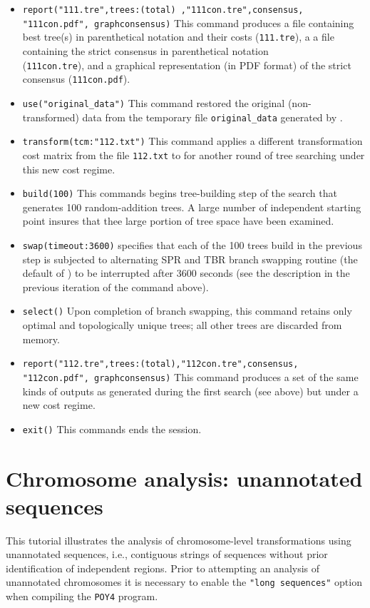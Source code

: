\begin{itemize}
\item \texttt{report("111.tre",trees:(total) ,"111con.tre",consensus,\\"111con.pdf", graphconsensus)} This command produces a file containing best tree(s) in parenthetical notation and their costs (\texttt{111.tre}), a a file containing the strict consensus in parenthetical notation \\(\texttt{111con.tre}), and a graphical representation (in PDF format) of the strict consensus (\texttt{111con.pdf}).
\item \texttt{use("original\_data")} This command restored the original (non-trans\-formed) data from the temporary file \texttt{original\_data} generated by .
\item \texttt{transform(tcm:"112.txt")} This command applies a different transformation cost matrix from the file \texttt{112.txt} to for another round of tree searching under this new cost regime.
\item \texttt{build(100)} This commands begins tree-building step of the search that generates 100 random-addition trees. A large number of independent starting point insures that thee large portion of tree space have been examined.
\item \texttt{swap(timeout:3600)}  specifies that each of the 100 trees build in the previous step is subjected to alternating SPR and TBR branch swapping routine (the default of \poy) to be interrupted after 3600 seconds (see the description in the previous iteration of the command above).
\item \texttt{select()} Upon completion of branch swapping, this command retains only optimal and topologically unique trees; all other trees are discarded from memory.
\item \texttt{report("112.tre",trees:(total),"112con.tre",consensus,\\"112con.pdf", graphconsensus)} This command produces a set of the same kinds of outputs as generated during the first search (see above) but under a new cost regime.
\item \texttt{exit()} This commands ends the \poy session.
\end{itemize}

\section{Chromosome analysis: unannotated sequences}{\label{tutorial4.6}}

This tutorial illustrates the analysis of chromosome-level transformations using 
unannotated sequences, i.e., contiguous strings of sequences without prior 
identification of independent regions. Prior to attempting an analysis of  
unannotated chromosomes it is necessary to enable the \texttt {"long sequences"}
option when compiling the \texttt{POY4} program. 


